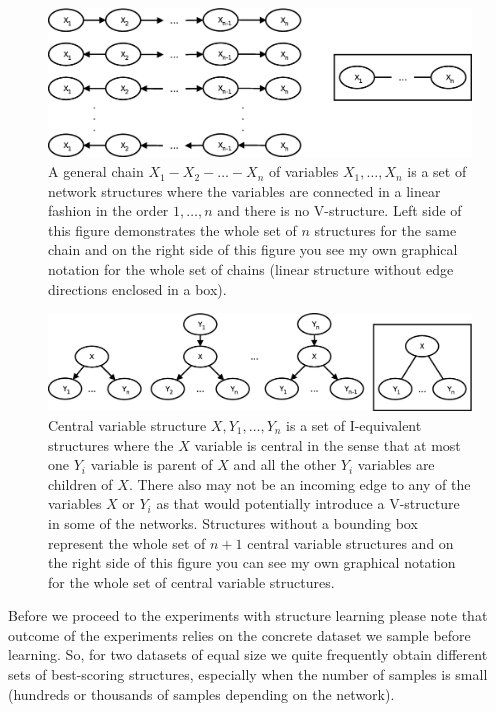\documentclass[english,cover]{fitthesis} %
\begin{document}
\begin{figure}[ht]
    \centering
    \includegraphics[scale=0.4]{fig/structure-learning-chain}
    \caption{A general chain $X_1 - X_2 - \dots - X_n$ of variables $X_1, \dots, X_n$ is a set of network structures where the variables are connected in a linear fashion in the order $1, \dots, n$ and there is no V-structure. Left side of this figure demonstrates the whole set of $n$ structures for the same chain and on the right side of this figure you see my own graphical notation for the whole set of chains (linear structure without edge directions enclosed in a box).}
    \label{fig:structure_learning_chain}
\end{figure}
\begin{figure}[ht]
    \centering
    \includegraphics[scale=0.4]{fig/structure-learning-central-variable}
    \caption{Central variable structure $X,Y_1,\dots,Y_n$ is a set of I-equivalent structures where the $X$ variable is central in the sense that at most one $Y_i$ variable is parent of $X$ and all the other $Y_i$ variables are children of $X$. There also may not be an incoming edge to any of the variables $X$ or $Y_i$ as that would potentially introduce a V-structure in some of the networks.
Structures without a bounding box represent the whole set of $n+1$ central variable structures and on the right side of this figure you can see my own graphical notation for the whole set of central variable structures.}
    \label{fig:structure_learning_central_variable}
\end{figure}

Before we proceed to the experiments with structure learning please note that outcome of the experiments relies on the concrete dataset we sample before learning. So, for two datasets of equal size we quite frequently obtain different sets of best-scoring structures, especially when the number of samples is small (hundreds or thousands of samples depending on the network).
\end{document}

